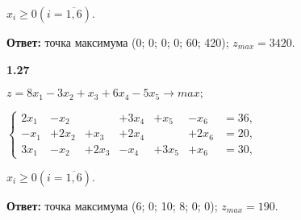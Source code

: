 \documentclass[10pt, a5paper, twoside]{article} %
\begin{document}
$x_i \geq 0 (i = \overline{1,6}).$

\textbf{Ответ: } точка максимума (0; 0; 0; 0; 60; 420); $z_{max} = 3420.$

\textbf{1.27}

$z=8x_1 - 3x_2 + x_3 + 6x_4 - 5x_5\rightarrow max;$

$
\left\{
\begin{array}{ccccccc}
2x_1  &-x_2   &       &+3x_4   &+x_5   &-x_6   &=36, \\
-x_1  &+2x_2  &+x_3   &+2x_4   &       &+2x_6  &=20, \\
3x_1  &-x_2   &+2x_3  &-x_4    &+3x_5  &+x_6   &=30,
\end{array}
\right.
$

$x_i \geq 0 (i = \overline{1,6}).$

\textbf{Ответ: } точка максимума (6; 0; 10; 8; 0; 0); $z_{max} = 190.$
\end{document}
